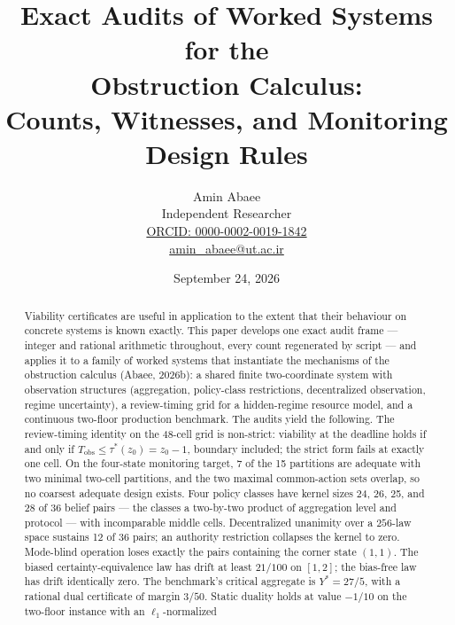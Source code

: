 \documentclass[10pt,twocolumn]{article}
\theoremstyle{definition}
\begin{document}
\title{Exact Audits of Worked Systems for the\\
Obstruction Calculus:\\
Counts, Witnesses, and Monitoring Design Rules}
\author{Amin Abaee\\[0.35em]
{\small Independent Researcher}\\[0.55em]
{\small\href{https://orcid.org/0000-0002-0019-1842}{ORCID: 0000-0002-0019-1842}}\\[0.3em]
{\small\href{mailto:amin\_abaee@ut.ac.ir}{amin\_abaee@ut.ac.ir}}}
\date{September 24, 2026}
\maketitle

\begin{abstract}
Viability certificates are useful in application to the extent that their
behaviour on concrete systems is known exactly. This paper develops one
exact audit frame --- integer and rational arithmetic throughout, every
count regenerated by script --- and applies it to a family of worked
systems that instantiate the mechanisms of the obstruction calculus
(Abaee, 2026b): a shared finite two-coordinate system with observation
structures (aggregation, policy-class restrictions, decentralized
observation, regime uncertainty), a review-timing grid for a
hidden-regime resource model, and a continuous two-floor production
benchmark. The audits yield the following. The review-timing identity on
the 48-cell grid is non-strict: viability at the deadline holds if and
only if \(T_{\mathrm{obs}} \le \tau^{*}(z_0) = z_0 - 1\), boundary
included; the strict form fails at exactly one cell. On the four-state
monitoring target, 7 of the 15 partitions are adequate with two minimal
two-cell partitions, and the two maximal common-action sets overlap, so
no coarsest adequate design exists. Four policy classes have kernel
sizes 24, 26, 25, and 28 of 36 belief pairs --- the classes a two-by-two
product of aggregation level and protocol --- with incomparable middle
cells. Decentralized unanimity over a
\(256\)-law space sustains 12 of 36 pairs; an authority restriction
collapses the kernel to zero. Mode-blind operation loses exactly the
pairs containing the corner state \((1,1)\). The biased certainty-equivalence law has
drift at least \(21/100\) on \([1,2]\); the bias-free law has drift
identically zero. The benchmark's critical aggregate is \(Y^{*} = 27/5\),
with a rational dual certificate of margin \(3/50\). Static duality
holds at value \(-1/10\) on the two-floor instance with an \(\ell_1\)-normalized

\end{abstract}
\end{document}
